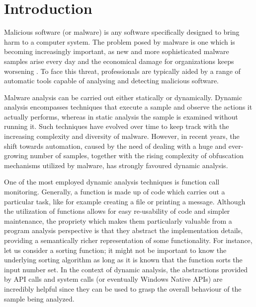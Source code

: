 
\chapter{Introduction}

\iffalse
Malwares are a threat

Dynamic analysis is favoured over static analysis

One dynamic analysis technique is API hooking/tracing

Malwares are also evasive

Problem: API hooking and tracing evasive samples

Solution BlueTracer
\fi

Malicious software (or malware) is any software specifically designed to bring harm to a computer system. The problem posed by malware is one which is becoming increasingly important, as new and more sophisticated malware samples arise every day and the economical damage for organizations keeps worsening \cite{Cisco}. To face this threat, professionals are typically aided by a range of automatic tools capable of analysing and detecting malicious software.

Malware analysis can be carried out either statically or dynamically. Dynamic analysis encompasses techniques that execute a sample and observe the actions it actually performs, whereas in static analysis the sample is examined without running it. Such techniques have evolved over time to keep track with the increasing complexity and diversity of malware. However, in recent years, the shift towards automation, caused by the need of dealing with a huge and ever-growing number of samples, together with the rising complexity of obfuscation mechanisms utilized by malware, has strongly favoured dynamic analysis.  

One of the most employed dynamic analysis techniques is function call monitoring. Generally, a function is made up of code which carries out a particular task, like for example creating a file or printing a message. Although the utilization of functions allows for easy re-usability of code and simpler maintenance, the propriety which makes them particularly valuable from a program analysis perspective is that they abstract the implementation details, providing a semantically richer representation of some functionality. For instance, let us consider a sorting function; it might not be important to know the underlying sorting algorithm as long as it is known that the function sorts the input number set. In the context of dynamic analysis, the abstractions provided by API calls and system calls (or eventually Windows Native APIs) are incredibly helpful since they can be used to grasp the overall behaviour of the sample being analyzed.

